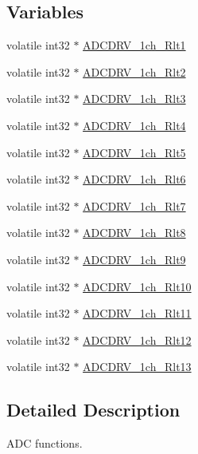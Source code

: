 \subsection*{Variables}
\begin{DoxyCompactItemize}
\item 
volatile int32 $\ast$ \hyperlink{a00012_a42ca9720519e1d0cb7ded4f56da083ba}{A\-D\-C\-D\-R\-V\-\_\-1ch\-\_\-\-Rlt1}
\item 
volatile int32 $\ast$ \hyperlink{a00012_a1ca55c7841c3e4bc154789647a068810}{A\-D\-C\-D\-R\-V\-\_\-1ch\-\_\-\-Rlt2}
\item 
volatile int32 $\ast$ \hyperlink{a00012_a1704632b071d0fff6bdc9629549c5d08}{A\-D\-C\-D\-R\-V\-\_\-1ch\-\_\-\-Rlt3}
\item 
volatile int32 $\ast$ \hyperlink{a00012_ac181cb2fb372cceb0f55844ed941c5d0}{A\-D\-C\-D\-R\-V\-\_\-1ch\-\_\-\-Rlt4}
\item 
volatile int32 $\ast$ \hyperlink{a00012_a7b586f409f6daf8232917fbd976532a4}{A\-D\-C\-D\-R\-V\-\_\-1ch\-\_\-\-Rlt5}
\item 
volatile int32 $\ast$ \hyperlink{a00012_ae8182c9b35af2d72b1c18ea41ccece2d}{A\-D\-C\-D\-R\-V\-\_\-1ch\-\_\-\-Rlt6}
\item 
volatile int32 $\ast$ \hyperlink{a00012_a4fa6265d0bf9b69d560d8f9f488b98c1}{A\-D\-C\-D\-R\-V\-\_\-1ch\-\_\-\-Rlt7}
\item 
volatile int32 $\ast$ \hyperlink{a00012_a0415309d16a115f0116a26aeda91aabd}{A\-D\-C\-D\-R\-V\-\_\-1ch\-\_\-\-Rlt8}
\item 
volatile int32 $\ast$ \hyperlink{a00012_adea6b0b8533e0d56a5c6cbac1c1e705f}{A\-D\-C\-D\-R\-V\-\_\-1ch\-\_\-\-Rlt9}
\item 
volatile int32 $\ast$ \hyperlink{a00012_ad1b851523cd317f0910f2db4220f32da}{A\-D\-C\-D\-R\-V\-\_\-1ch\-\_\-\-Rlt10}
\item 
volatile int32 $\ast$ \hyperlink{a00012_ad4435404e2f432a8c3a449dd23cda8f0}{A\-D\-C\-D\-R\-V\-\_\-1ch\-\_\-\-Rlt11}
\item 
volatile int32 $\ast$ \hyperlink{a00012_ac3656f047361723ec883e6ebfe3f026a}{A\-D\-C\-D\-R\-V\-\_\-1ch\-\_\-\-Rlt12}
\item 
volatile int32 $\ast$ \hyperlink{a00012_ad7ef0544a173d3c7883f0e739b7d2096}{A\-D\-C\-D\-R\-V\-\_\-1ch\-\_\-\-Rlt13}
\end{DoxyCompactItemize}


\subsection{Detailed Description}
A\-D\-C functions. 

